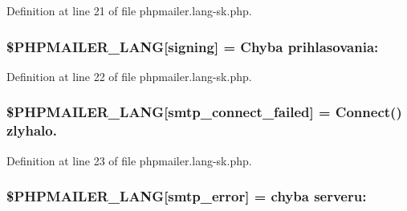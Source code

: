 Definition at line 21 of file phpmailer.\+lang-\/sk.\+php.

\subsubsection[{\texorpdfstring{\$\+P\+H\+P\+M\+A\+I\+L\+E\+R\+\_\+\+L\+A\+NG}{$PHPMAILER_LANG}}]{\setlength{\rightskip}{0pt plus 5cm}\$P\+H\+P\+M\+A\+I\+L\+E\+R\+\_\+\+L\+A\+NG\mbox{[}\textquotesingle{}signing\textquotesingle{}\mbox{]} = \textquotesingle{}Chyba prihlasovania\+: \textquotesingle{}}\hypertarget{phpmailer_8lang-sk_8php_a68e437bdb9b968a5a67320f03d231565}{}\label{phpmailer_8lang-sk_8php_a68e437bdb9b968a5a67320f03d231565}


Definition at line 22 of file phpmailer.\+lang-\/sk.\+php.

\subsubsection[{\texorpdfstring{\$\+P\+H\+P\+M\+A\+I\+L\+E\+R\+\_\+\+L\+A\+NG}{$PHPMAILER_LANG}}]{\setlength{\rightskip}{0pt plus 5cm}\$P\+H\+P\+M\+A\+I\+L\+E\+R\+\_\+\+L\+A\+NG\mbox{[}\textquotesingle{}smtp\+\_\+connect\+\_\+failed\textquotesingle{}\mbox{]} =  Connect() zlyhalo.\textquotesingle{}}\hypertarget{phpmailer_8lang-sk_8php_a7b321d4ca1e9df702403ed4c61aa0980}{}\label{phpmailer_8lang-sk_8php_a7b321d4ca1e9df702403ed4c61aa0980}


Definition at line 23 of file phpmailer.\+lang-\/sk.\+php.

\subsubsection[{\texorpdfstring{\$\+P\+H\+P\+M\+A\+I\+L\+E\+R\+\_\+\+L\+A\+NG}{$PHPMAILER_LANG}}]{\setlength{\rightskip}{0pt plus 5cm}\$P\+H\+P\+M\+A\+I\+L\+E\+R\+\_\+\+L\+A\+NG\mbox{[}\textquotesingle{}smtp\+\_\+error\textquotesingle{}\mbox{]} =  chyba serveru\+: \textquotesingle{}}\hypertarget{phpmailer_8lang-sk_8php_a7d9cffba1e669c845f8a4c891ee50064}{}\label{phpmailer_8lang-sk_8php_a7d9cffba1e669c845f8a4c891ee50064}



